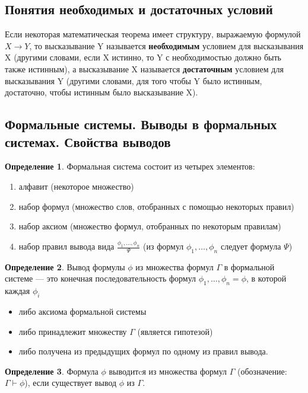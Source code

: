 \documentclass[a4paper]{article}
\theoremstyle{definition}
\newtheorem*{definition}{Определение}
\theoremstyle{remark}
\begin{document}
    \subsection{Понятия необходимых и достаточных условий}
    Если некоторая математическая теорема имеет структуру, выражаемую формулой $X\to Y$, то высказывание Y 
    называется \textbf{необходимым} условием для высказывания X (другими словами, если X истинно, то Y с необходимостью должно быть 
    также истинным), а высказывание X называется \textbf{достаточным} условием для высказывания Y (другими словами, для того чтобы Y 
    было истинным, достаточно, чтобы истинным было высказывание X).
    \subsection{Формальные системы. Выводы в формальных системах. Свойства выводов}
    \begin{definition}
        Формальная система состоит из четырех элементов:
        \begin{enumerate}
            \item алфавит (некоторое множество)
            \item набор формул (множество слов, отобранных с помощью некоторых правил)
            \item набор аксиом (множество формул, отобранных по некоторым правилам)
            \item набор правил вывода вида $\frac{\phi_1, \dots, \phi_n}{\Psi}$
            (из формул $\phi_1, \dots, \phi_n$ следует формула $\Psi$)
        \end{enumerate}
    \end{definition}
    \begin{definition}
        Вывод формулы $\phi$ из множества формул $\Gamma$ в формальной системе — это конечная 
        последовательность формул $\phi_1, \dots , \phi_n = \phi$, в которой каждая $\phi_i$
        \begin{itemize}
            \item либо аксиома формальной системы
            \item либо принадлежит множеству $\Gamma$ (является гипотезой)
            \item либо получена из предыдущих формул по одному из правил вывода.
        \end{itemize}
    \end{definition}
    \begin{definition}
        Формула $\phi$ выводитcя из множества формул $\Gamma$ (обозначение:$ \Gamma \vdash \phi$), если существует 
вывод $\phi$ из $\Gamma$.
    \end{definition}
\end{document}
